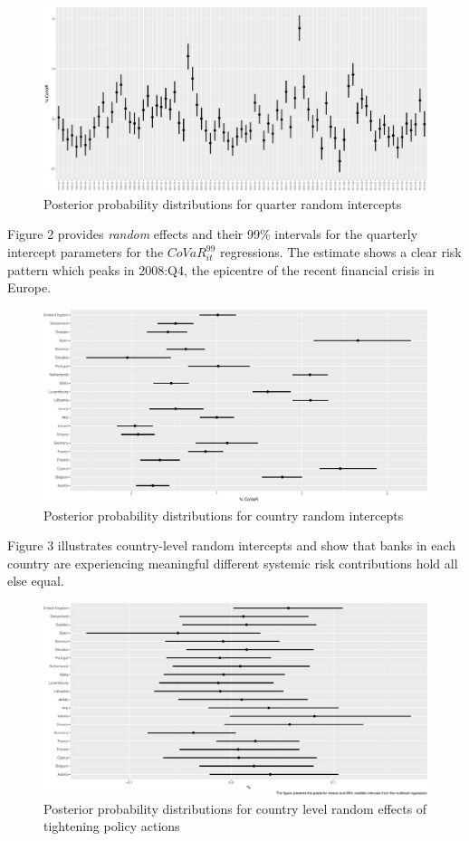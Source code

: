 \documentclass[
  10pt,
]{article}
\begin{document}
\begin{figure}[H]
\includegraphics{figures/paper-fig3-1} \caption{Posterior probability distributions for quarter random intercepts}\label{fig:fig3}
\end{figure}

Figure 2 provides \emph{random} effects and their 99\% intervals for the
quarterly intercept parameters for the \(CoVaR^{99}_{it}\) regressions.
The estimate shows a clear risk pattern which peaks in 2008:Q4, the
epicentre of the recent financial crisis in Europe.

\begin{figure}[H]
\includegraphics{figures/paper-fig4-1} \caption{Posterior probability distributions for country random intercepts}\label{fig:fig4}
\end{figure}

Figure 3 illustrates country-level random intercepts and show that banks
in each country are experiencing meaningful different systemic risk
contributions hold all else equal.

\begin{figure}[H]
\includegraphics{figures/paper-fig5-1} \caption{Posterior probability distributions for country level random effects of tightening policy actions}\label{fig:fig5}
\end{figure}
\end{document}
